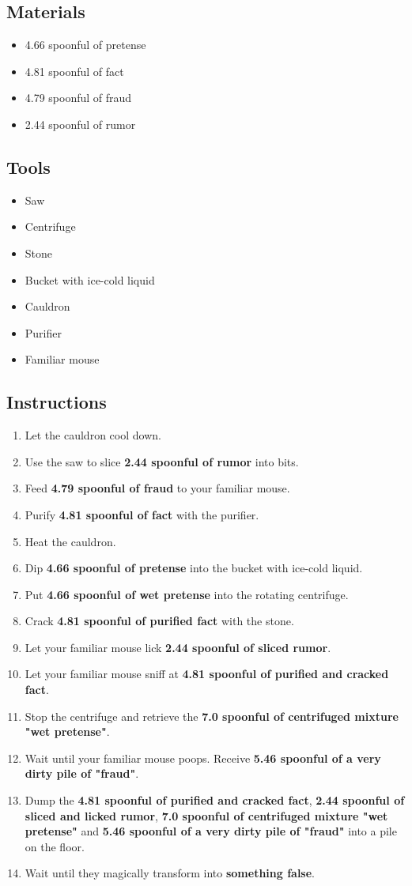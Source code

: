 \documentclass{article}
\begin{document}
\subsection{Materials}\begin{itemize}
\item 
4.66 spoonful of pretense
\item 
4.81 spoonful of fact
\item 
4.79 spoonful of fraud
\item 
2.44 spoonful of rumor
\end{itemize}
\subsection{Tools}\begin{itemize}
\item 
Saw
\item 
Centrifuge
\item 
Stone
\item 
Bucket with ice-cold liquid
\item 
Cauldron
\item 
Purifier
\item 
Familiar mouse
\end{itemize}
\subsection{Instructions}\begin{enumerate}
\item 
Let the cauldron cool down.
\item 
Use the saw to slice \textbf{2.44 spoonful of rumor} into bits.
\item 
Feed \textbf{4.79 spoonful of fraud} to your familiar mouse.
\item 
Purify \textbf{4.81 spoonful of fact} with the purifier.
\item 
Heat the cauldron.
\item 
Dip \textbf{4.66 spoonful of pretense} into the bucket with ice-cold liquid.
\item 
Put \textbf{4.66 spoonful of wet pretense} into the rotating centrifuge.
\item 
Crack \textbf{4.81 spoonful of purified fact} with the stone.
\item 
Let your familiar mouse lick \textbf{2.44 spoonful of sliced rumor}.
\item 
Let your familiar mouse sniff at \textbf{4.81 spoonful of purified and cracked fact}.
\item 
Stop the centrifuge and retrieve the \textbf{7.0 spoonful of centrifuged mixture "wet pretense"}.
\item 
Wait until your familiar mouse poops. Receive \textbf{5.46 spoonful of a very dirty pile of "fraud"}.
\item 
Dump the \textbf{4.81 spoonful of purified and cracked fact}, \textbf{2.44 spoonful of sliced and licked rumor}, \textbf{7.0 spoonful of centrifuged mixture "wet pretense"} and \textbf{5.46 spoonful of a very dirty pile of "fraud"} into a pile on the floor.
\item 
Wait until they magically transform into \textbf{something false}.
\end{enumerate}
\newpage
\end{document}
